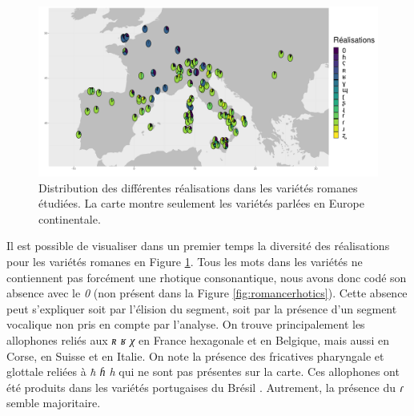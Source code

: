\begin{figure}
	\centering
	\includegraphics[width=1\linewidth]{substance/images/productionromane_1_viridis}
	\caption[Distribution des différentes réalisations dans les variétés romanes étudiées]{Distribution des différentes réalisations dans les variétés romanes étudiées. La carte montre seulement les variétés parlées en Europe continentale.}
	\label{fig:productionromane1viridis}
\end{figure}

Il est possible de visualiser dans un premier temps la diversité des réalisations pour les variétés romanes en Figure \ref{fig:productionromane1viridis}.
Tous les mots dans les variétés ne contiennent pas forcément une rhotique consonantique, nous avons donc codé son absence avec le \textit{0} (non présent dans la Figure \ref{fig:romancerhotics}). Cette absence peut s'expliquer soit par l'élision du segment, soit par la présence d'un segment vocalique non pris en compte par l'analyse.
On trouve principalement les allophones reliés aux \textit{ʀ ʁ χ} en France hexagonale et en Belgique, mais aussi en Corse, en Suisse et en Italie. 
On note la présence des fricatives pharyngale et glottale reliées à \textit{ħ ɦ h} qui ne sont pas présentes sur la carte. Ces allophones ont été produits dans les variétés portugaises du Brésil \parencite{rennickeVariationChangeRhotics2015}. Autrement, la présence du \textit{ɾ} semble majoritaire.\\

